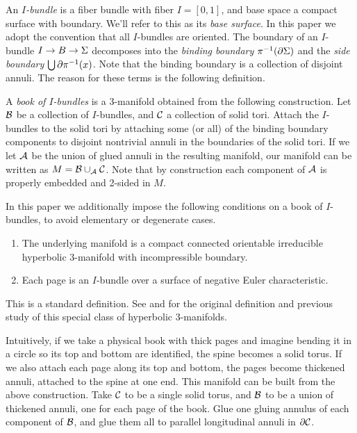 \begin{defn}\label{D:boib}

An \emph{$I$-bundle} is a fiber bundle with fiber $I=[0,1]$, and base space
a compact surface with boundary. We'll refer to this as its \emph{base
surface}.  In this paper we adopt the convention that all $I$-bundles are
oriented.  The boundary of an $I$-bundle $I \to B \to \Sigma$ decomposes into the
\emph{binding boundary} $\pi^{-1}(\partial \Sigma)$ and the \emph{side boundary}
$\bigcup \partial \pi^{-1}(x)$. Note that the binding boundary is a collection of
disjoint annuli. The reason for these terms is the following definition.

A \emph{book of $I$-bundles} is a 3-manifold obtained from the following
construction. Let $\mathcal{B}$ be a collection of $I$-bundles, and $\mathcal{C}$ a collection
of solid tori. Attach the $I$-bundles to the solid tori by attaching some (or
all) of the binding boundary components to disjoint nontrivial annuli in the
boundaries of the solid tori.  If we let $\mathcal{A}$ be the union of glued annuli in
the resulting manifold, our manifold can be written as $M=\mathcal{B} \cup_{\mathcal{A}} \mathcal{C}$.
Note that by construction each component of $\mathcal{A}$ is properly embedded and
2-sided in $M$.

In this paper we additionally impose the following conditions on a book of
$I$-bundles, to avoid elementary or degenerate cases.

\begin{enumerate}

\item The underlying manifold is a compact connected orientable irreducible
hyperbolic 3-manifold with incompressible boundary.

\item Each page is an $I$-bundle over a surface of negative Euler
characteristic.

\end{enumerate}

\end{defn}

This is a standard definition. See \cite[pp286]{CS} and \cite[Definition
2.1]{ACS} for the original definition and previous study of this special class
  of hyperbolic 3-manifolds.

Intuitively, if we take a physical book with thick pages and imagine bending it
in a circle so its top and bottom are identified, the spine becomes a solid
torus.  If we also attach each page along its top and bottom, the pages become
thickened annuli, attached to the spine at one end. This manifold can be built
from the above construction. Take $\mathcal{C}$ to be a single solid torus, and $\mathcal{B}$
to be a union of thickened annuli, one for each page of the book. Glue one
gluing annulus of each component of $\mathcal{B}$, and glue them all to parallel
longitudinal annuli in $\partial \mathcal{C}$.

